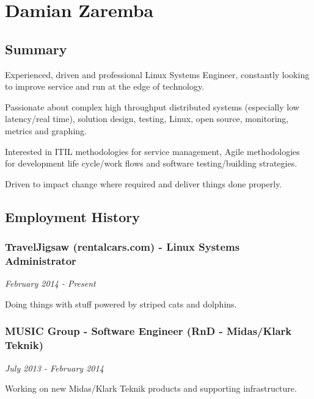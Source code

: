 \section{Damian Zaremba}\label{damian-zaremba}

\subsection{Summary}\label{summary}

Experienced, driven and professional Linux Systems Engineer, constantly
looking to improve service and run at the edge of technology.

Passionate about complex high throughput distributed systems (especially
low latency/real time), solution design, testing, Linux, open source,
monitoring, metrics and graphing.

Interested in ITIL methodologies for service management, Agile
methodologies for development life cycle/work flows and software
testing/building strategies.

Driven to impact change where required and deliver things done properly.

\subsection{Employment History}\label{employment-history}

\subsubsection{TravelJigsaw (rentalcars.com) - Linux Systems
Administrator}\label{traveljigsaw-rentalcars.com---linux-systems-administrator}

\emph{February 2014 - Present}

Doing things with stuff powered by striped cats and dolphins.

\subsubsection{MUSIC Group - Software Engineer (RnD - Midas/Klark
Teknik)}\label{music-group---software-engineer-rnd---midasklark-teknik}

\emph{July 2013 - February 2014}

Working on new Midas/Klark Teknik products and supporting
infrastructure.

